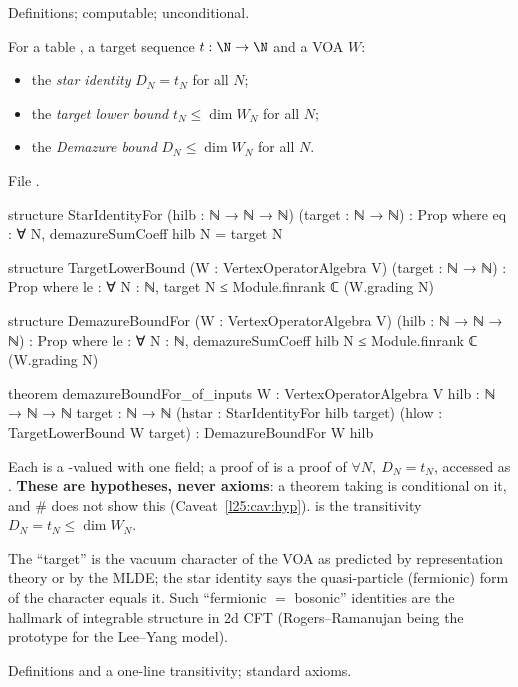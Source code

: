 \begin{status}
Definitions; computable; unconditional.
\end{status}

\begin{definition}\label{l25:def:inputs}
For a table , a target sequence $t:\N\to\N$ and a VOA $W$:
\begin{itemize}
\item the \emph{star identity} $D_N=t_N$ for all $N$;
\item the \emph{target lower bound} $t_N\le\dim W_N$ for all $N$;
\item the \emph{Demazure bound} $D_N\le\dim W_N$ for all $N$.
\end{itemize}
\end{definition}
\noindent File .
\begin{leancode}
structure StarIdentityFor (hilb : ℕ → ℕ → ℕ) (target : ℕ → ℕ) : Prop where
  eq : ∀ N, demazureSumCoeff hilb N = target N

structure TargetLowerBound (W : VertexOperatorAlgebra V) (target : ℕ → ℕ) : Prop where
  le : ∀ N : ℕ, target N ≤ Module.finrank ℂ (W.grading N)

structure DemazureBoundFor (W : VertexOperatorAlgebra V) (hilb : ℕ → ℕ → ℕ) : Prop where
  le : ∀ N : ℕ, demazureSumCoeff hilb N ≤ Module.finrank ℂ (W.grading N)

theorem demazureBoundFor_of_inputs {W : VertexOperatorAlgebra V} {hilb : ℕ → ℕ → ℕ}
    {target : ℕ → ℕ} (hstar : StarIdentityFor hilb target) (hlow : TargetLowerBound W target) :
    DemazureBoundFor W hilb
\end{leancode}
\begin{dictionary}
Each is a -valued  with one field; a proof of  is a
proof of $\forall N,\ D_N=t_N$, accessed as . \textbf{These are hypotheses, never axioms}: a
theorem taking  is conditional on it, and \# does not
show this (Caveat~\ref{l25:cav:hyp}).  is the transitivity
$D_N=t_N\le\dim W_N$.
\end{dictionary}
\begin{physics}
The ``target'' is the vacuum character of the VOA as predicted by representation theory or by the MLDE; the
star identity says the quasi-particle (fermionic) form of the character equals it. Such ``fermionic $=$
bosonic'' identities are the hallmark of integrable structure in 2d CFT (Rogers--Ramanujan being the
prototype for the Lee--Yang model).
\end{physics}
\begin{status}
Definitions and a one-line transitivity; standard axioms.
\end{status}

